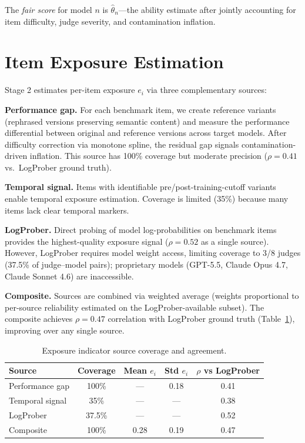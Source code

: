 \documentclass[11pt]{article}
\newcommand{\thetahat}{\hat{\theta}}
\newcommand{\ei}{e_i}
\begin{document}
The \emph{fair score} for model $n$ is $\thetahat_n$---the ability estimate after jointly accounting for item difficulty, judge severity, and contamination inflation.

\section{Item Exposure Estimation}
\label{sec:exposure}

Stage 2 estimates per-item exposure $\ei$ via three complementary sources:

\textbf{Performance gap.} For each benchmark item, we create reference variants (rephrased versions preserving semantic content) and measure the performance differential between original and reference versions across target models. After difficulty correction via monotone spline, the residual gap signals contamination-driven inflation. This source has 100\% coverage but moderate precision ($\rho = 0.41$ vs.\ LogProber ground truth).

\textbf{Temporal signal.} Items with identifiable pre/post-training-cutoff variants enable temporal exposure estimation. Coverage is limited (35\%) because many items lack clear temporal markers.

\textbf{LogProber.} Direct probing of model log-probabilities on benchmark items provides the highest-quality exposure signal ($\rho = 0.52$ as a single source). However, LogProber requires model weight access, limiting coverage to 3/8 judges (37.5\% of judge--model pairs); proprietary models (GPT-5.5, Claude Opus 4.7, Claude Sonnet 4.6) are inaccessible.

\textbf{Composite.} Sources are combined via weighted average (weights proportional to per-source reliability estimated on the LogProber-available subset). The composite achieves $\rho = 0.47$ correlation with LogProber ground truth (Table~\ref{tab:exposure}), improving over any single source.

\begin{table}[t]
\centering
\caption{Exposure indicator source coverage and agreement.}
\label{tab:exposure}
\small
\begin{tabular}{lcccc}
\toprule
Source & Coverage & Mean $\ei$ & Std $\ei$ & $\rho$ vs LogProber \\
\midrule
Performance gap & 100\% & --- & 0.18 & 0.41 \\
Temporal signal & 35\% & --- & --- & 0.38 \\
LogProber & 37.5\% & --- & --- & 0.52 \\
\midrule
Composite & 100\% & 0.28 & 0.19 & 0.47 \\
\bottomrule
\end{tabular}
\end{table}
\end{document}
